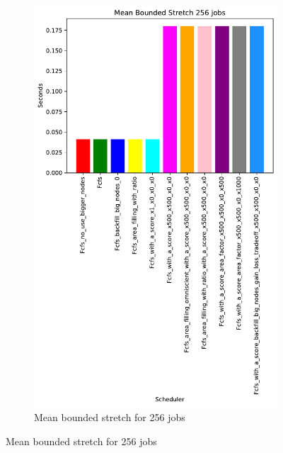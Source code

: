 \documentclass[a4paper]{article}
\begin{document}
\begin{figure}[H]
\begin{subfigure}[b]{0.4\linewidth}\centering\includegraphics[width=0.7\linewidth]{MBSS/plot/Results_Size_And_Data_2022-03-01->2022-03-03_V9532_Mean_Stretch_With_a_Minimum_256_450_128_32_256_4_1024.pdf}\caption{Mean bounded stretch for 256 jobs}\label{45}\end{subfigure}

\end{figure}
\end{document}
